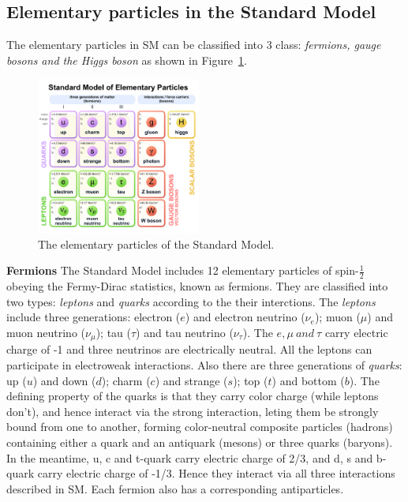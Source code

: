 \subsection{Elementary particles in the Standard Model}
\label{elementaryparticles}

The elementary particles in SM can be classified into 3 class: \textit{fermions, gauge bosons and the Higgs boson} as shown in Figure~\ref{fig:eleP-1}.
\begin{figure}[!htb]
  \centering
  \includegraphics[width=0.48\textwidth]{figures/Theory/Standard_Model_of_Elementary_Particles.pdf}
  \caption{The elementary particles of the Standard Model.}
  \label{fig:eleP-1}
\end{figure}

\textbf{Fermions}
The Standard Model includes 12 elementary particles of spin-$\frac{1}{2}$ obeying the Fermy-Dirac statistics, known as fermions. 
They are classified into two types: \textit{leptons} and \textit{quarks} according to the their interctions.
The \textit{leptons} include three generations: electron ($e$) and electron neutrino ($\nu_{e}$); 
muon ($\mu$) and muon neutrino ($\nu_{\mu}$); tau ($\tau$) and tau neutrino ($\nu_{\tau}$).
The $e, \mu~and~\tau$ carry electric charge of -1 and three neutrinos are electrically neutral. 
All the leptons can participate in electroweak interactions.
Also there are three generations of \textit{quarks}: up ($u$) and down ($d$); charm ($c$) and strange ($s$); top ($t$) and bottom ($b$).
The defining property of the quarks is that they carry color charge (while leptons don't), and hence interact via the strong interaction, 
leting them be strongly bound from one to another, forming color-neutral composite 
particles (hadrons) containing either a quark and an antiquark (mesons) or three quarks (baryons).
In the meantime, u, c and t-quark carry electric charge of 2/3, and d, s and b-quark carry electric charge of -1/3. 
Hence they interact via all three interactions described in SM.
Each fermion also has a corresponding antiparticles.


